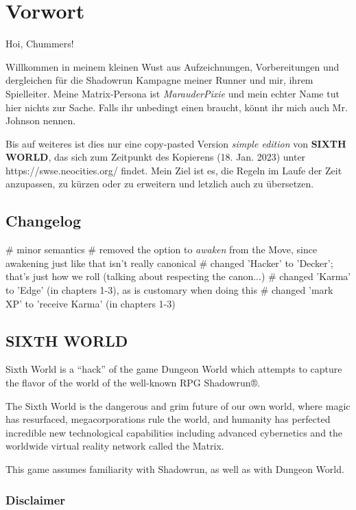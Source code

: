 \chapter{Vorwort}

Hoi, Chummers!

Willkommen in meinem kleinen Wust aus Aufzeichnungen, Vorbereitungen und dergleichen für die Shadowrun Kampagne meiner Runner und mir, ihrem Spielleiter. Meine Matrix-Persona ist \textit{MarauderPixie} und mein echter Name tut hier nichts zur Sache. Falls ihr unbedingt einen braucht, könnt ihr mich auch Mr. Johnson nennen.

Bis auf weiteres ist dies nur eine copy-pasted Version \textit{simple edition} von \textbf{SIXTH WORLD}, das sich zum Zeitpunkt des Kopierens (18. Jan. 2023) unter https://swse.neocities.org/ findet. Mein Ziel ist es, die Regeln im Laufe der Zeit anzupassen, zu kürzen oder zu erweitern und letzlich auch zu übersetzen.

\section{Changelog}

\begin{easylist}
# minor semantics
# removed the option to \textit{awaken} from the  Move, since awakening just like that isn't really canonical
# changed 'Hacker' to 'Decker'; that's just how we roll (talking about respecting the canon...)
# changed 'Karma' to 'Edge' (in chapters 1-3), as is customary when doing this
# changed 'mark XP' to 'receive Karma' (in chapters 1-3)
\end{easylist}


\section{SIXTH WORLD}

Sixth World is a “hack” of the game Dungeon World which attempts to capture the flavor of the world of the well-known RPG Shadowrun®.

The Sixth World is the dangerous and grim future of our own world, where magic has resurfaced, megacorporations rule the world, and humanity has perfected incredible new technological capabilities including advanced cybernetics and the worldwide virtual reality network called the Matrix.

This game assumes familiarity with Shadowrun, as well as with Dungeon World.

\subsection{Disclaimer}

